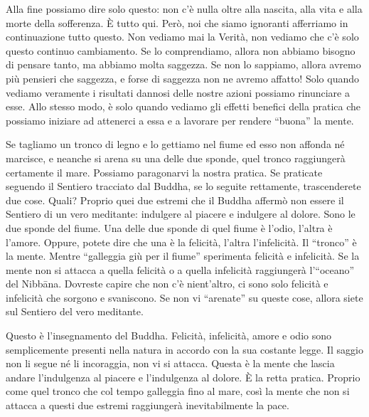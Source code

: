 Alla fine possiamo dire solo questo: non c'è nulla oltre alla nascita,
alla vita e alla morte della sofferenza. È tutto qui. Però, noi che
siamo ignoranti afferriamo in continuazione tutto questo. Non vediamo
mai la Verità, non vediamo che c'è solo questo continuo cambiamento. Se
lo comprendiamo, allora non abbiamo bisogno di pensare tanto, ma abbiamo
molta saggezza. Se non lo sappiamo, allora avremo più pensieri che
saggezza, e forse di saggezza non ne avremo affatto! Solo quando vediamo
veramente i risultati dannosi delle nostre azioni possiamo rinunciare a
esse. Allo stesso modo, è solo quando vediamo gli effetti benefici della
pratica che possiamo iniziare ad attenerci a essa e a lavorare per
rendere ``buona'' la mente.

Se tagliamo un tronco di legno e lo gettiamo nel fiume ed esso non
affonda né marcisce, e neanche si arena su una delle due sponde, quel
tronco raggiungerà certamente il mare. Possiamo paragonarvi la nostra
pratica. Se praticate seguendo il Sentiero tracciato dal Buddha, se lo
seguite rettamente, trascenderete due cose. Quali? Proprio quei due
estremi che il Buddha affermò non essere il Sentiero di un vero
meditante: indulgere al piacere e indulgere al dolore. Sono le due
sponde del fiume. Una delle due sponde di quel fiume è l'odio, l'altra è
l'amore. Oppure, potete dire che una è la felicità, l'altra
l'infelicità. Il ``tronco'' è la mente. Mentre ``galleggia giù per il
fiume'' sperimenta felicità e infelicità. Se la mente non si attacca a
quella felicità o a quella infelicità raggiungerà l'``oceano'' del
Nibbāna. Dovreste capire che non c'è nient'altro, ci sono solo
felicità e infelicità che sorgono e svaniscono. Se non vi ``arenate'' su
queste cose, allora siete sul Sentiero del vero meditante.

Questo è l'insegnamento del Buddha. Felicità, infelicità, amore e odio
sono semplicemente presenti nella natura in accordo con la sua costante
legge. Il saggio non li segue né li incoraggia, non vi si attacca.
Questa è la mente che lascia andare l'indulgenza al piacere e
l'indulgenza al dolore. È la retta pratica. Proprio come quel tronco che
col tempo galleggia fino al mare, così la mente che non si attacca a
questi due estremi raggiungerà inevitabilmente la pace.

